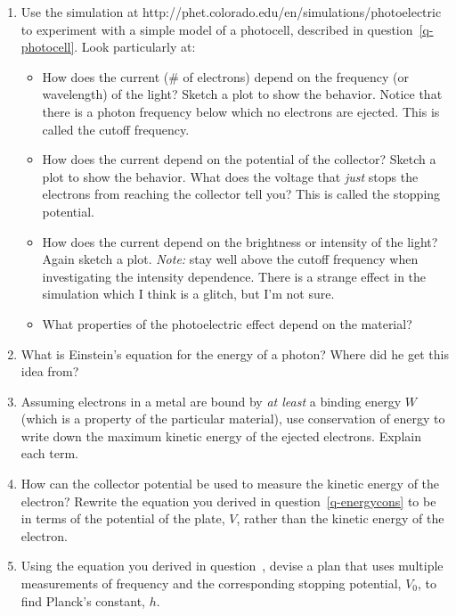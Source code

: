 \documentclass{tufte-handout}
\begin{document}
\begin{enumerate}
\item Use the simulation at http://phet.colorado.edu/en/simulations/photoelectric to experiment with a simple model of a photocell, described in question~\ref{q-photocell}.  Look particularly at:
\begin{itemize}
	\item How does the current (\# of electrons) depend on the frequency (or wavelength) of the light?  Sketch a plot to show the behavior.  Notice that there is a photon frequency below which no electrons are ejected.  This is called the cutoff frequency.
	\item How does the current depend on the potential of the collector?  Sketch a plot to show the behavior.  What does the voltage that {\em just} stops the electrons from reaching the collector tell you?  This is called the stopping potential.
	\item How does the current depend on the brightness or intensity of the light? Again sketch a plot.  {\em Note:} stay well above the cutoff frequency when investigating the intensity dependence.  There is a strange effect in the simulation which I think is a glitch, but I'm not sure.
	\item What properties of the photoelectric effect depend on the material?
\end{itemize}

\item What is Einstein's equation for the energy of a photon?  Where did he get this idea from?

\item \label{q-energycons} Assuming electrons in a metal are bound by {\em at least} a binding energy $W$ (which is a property of the particular material), use conservation of energy to write down the maximum kinetic energy of the ejected electrons.  Explain each term.

\item  \label{q-pe-equation} How can the collector potential be used to measure the kinetic energy of the electron?  Rewrite the equation you derived in question~\ref{q-energycons} to be in terms of the potential of the plate, $V$, rather than the kinetic energy of the electron.

\item Using the equation you derived in question~\label{q-pe-equation}, devise a plan that uses multiple measurements of frequency and the corresponding stopping potential, $V_0$, to find Planck's constant, $h$.

\end{enumerate}
\end{document}
